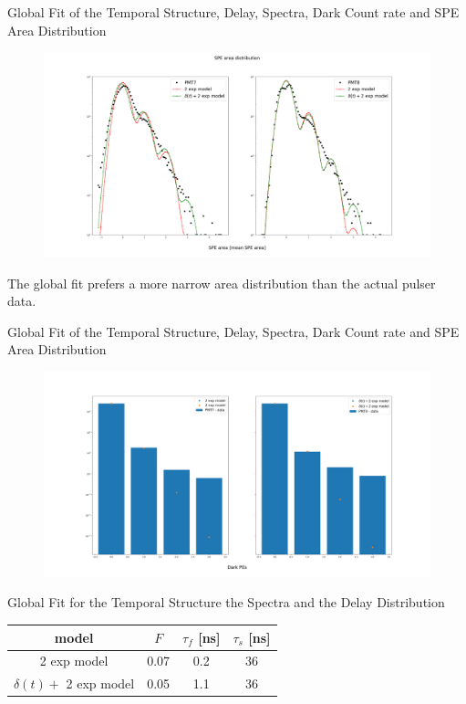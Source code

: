 \documentclass{beamer}
\begin{document}
\begin{frame}{Global Fit of the Temporal Structure, Delay, Spectra, Dark Count rate and SPE Area Distribution}
\begin{figure}[h]
\includegraphics[width=1\textwidth]{area_fit.png}
\end{figure}
The global fit prefers a more narrow area distribution than the actual pulser data.
\end{frame}

\begin{frame}{Global Fit of the Temporal Structure, Delay, Spectra, Dark Count rate and SPE Area Distribution}
\begin{figure}[h]
\includegraphics[width=1\textwidth]{DC_fit.png}
\end{figure}
\end{frame}

\begin{frame}{Global Fit for the Temporal Structure the Spectra and the Delay Distribution}
\begin{center}
\begin{tabular}{|c|c|c|c|} 
\hline
model & $F$ & $\tau_f$ [ns] & $\tau_s$ [ns]\\ 
\hline\hline
2 exp model & 0.07 & 0.2 & 36\\
\hline
$\delta(t)+$ 2 exp model& 0.05 & 1.1 & 36\\
\hline
\end{tabular}
\end{center} 
\end{frame}
\end{document}

